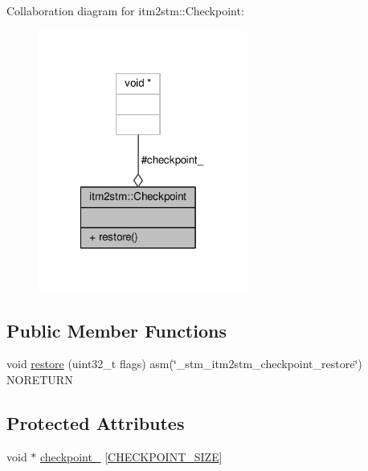 Collaboration diagram for itm2stm\-:\-:Checkpoint\-:
\nopagebreak
\begin{figure}[H]
\begin{center}
\leavevmode
\includegraphics[width=194pt]{classitm2stm_1_1Checkpoint__coll__graph}
\end{center}
\end{figure}
\subsection*{Public Member Functions}
\begin{DoxyCompactItemize}
\item 
void \hyperlink{classitm2stm_1_1Checkpoint_a7a049013aa0937e393f3dcdad662dc42}{restore} (uint32\-\_\-t flags) asm(\char`\"{}\-\_\-stm\-\_\-itm2stm\-\_\-checkpoint\-\_\-restore\char`\"{}) N\-O\-R\-E\-T\-U\-R\-N
\end{DoxyCompactItemize}
\subsection*{Protected Attributes}
\begin{DoxyCompactItemize}
\item 
void $\ast$ \hyperlink{classitm2stm_1_1Checkpoint_a45025466fb630de70588c6c88e7709a0}{checkpoint\-\_\-} \mbox{[}\hyperlink{64_2checkpoint_8h_a657775ddcd578e29251202cad8a50e7c}{C\-H\-E\-C\-K\-P\-O\-I\-N\-T\-\_\-\-S\-I\-Z\-E}\mbox{]}
\end{DoxyCompactItemize}


